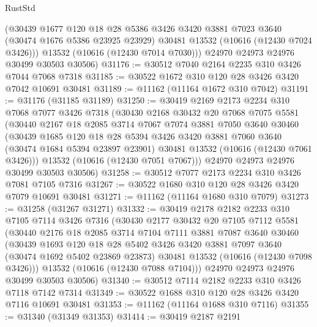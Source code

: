 \begin{lexlean}{RustStd}
\begin{coremodule}
        (@30439
          @1677
          @120
          @18
          @28
          @5386
          @3426
          @3420
          @3881
          @7023
          @3640
          (@30474 @1676 @5386 @23925 @23929)
          @30481
          @13532
          (@10616 (@12430 @7024 @3426)))
        @13532
        (@10616 (@12430 @7014 @7030)))
      @24970
      @24973
      @24976
      @30499
      @30503
      @30506)
@31176 := @30512 @7040 @2164 @2235 @310 @3426 @7044 @7068 @7318
@31185 := @30522 @1672 @310 @120 @28 @3426 @3420 @7042 @10691 @30481
@31189 := @11162 (@11164 @1672 @310 @7042)
@31191 := @31176 (@31185 @31189)
@31250 := @30419
    @2169
    @2173
    @2234
    @310
    @7068
    @7077
    @3426
    @7318
    (@30430
      @2168
      @30432
      @20
      @7068
      @7075
      @5581
      (@30440
        @2167
        @18
        @2085
        @3714
        @7067
        @7074
        @3881
        @7050
        @3640
        @30460
        (@30439
          @1685
          @120
          @18
          @28
          @5394
          @3426
          @3420
          @3881
          @7060
          @3640
          (@30474 @1684 @5394 @23897 @23901)
          @30481
          @13532
          (@10616 (@12430 @7061 @3426)))
        @13532
        (@10616 (@12430 @7051 @7067)))
      @24970
      @24973
      @24976
      @30499
      @30503
      @30506)
@31258 := @30512 @7077 @2173 @2234 @310 @3426 @7081 @7105 @7316
@31267 := @30522 @1680 @310 @120 @28 @3426 @3420 @7079 @10691 @30481
@31271 := @11162 (@11164 @1680 @310 @7079)
@31273 := @31258 (@31267 @31271)
@31332 := @30419
    @2178
    @2182
    @2233
    @310
    @7105
    @7114
    @3426
    @7316
    (@30430
      @2177
      @30432
      @20
      @7105
      @7112
      @5581
      (@30440
        @2176
        @18
        @2085
        @3714
        @7104
        @7111
        @3881
        @7087
        @3640
        @30460
        (@30439
          @1693
          @120
          @18
          @28
          @5402
          @3426
          @3420
          @3881
          @7097
          @3640
          (@30474 @1692 @5402 @23869 @23873)
          @30481
          @13532
          (@10616 (@12430 @7098 @3426)))
        @13532
        (@10616 (@12430 @7088 @7104)))
      @24970
      @24973
      @24976
      @30499
      @30503
      @30506)
@31340 := @30512 @7114 @2182 @2233 @310 @3426 @7118 @7142 @7314
@31349 := @30522 @1688 @310 @120 @28 @3426 @3420 @7116 @10691 @30481
@31353 := @11162 (@11164 @1688 @310 @7116)
@31355 := @31340 (@31349 @31353)
@31414 := @30419
    @2187
    @2191

\end{coremodule}
\end{lexlean}
